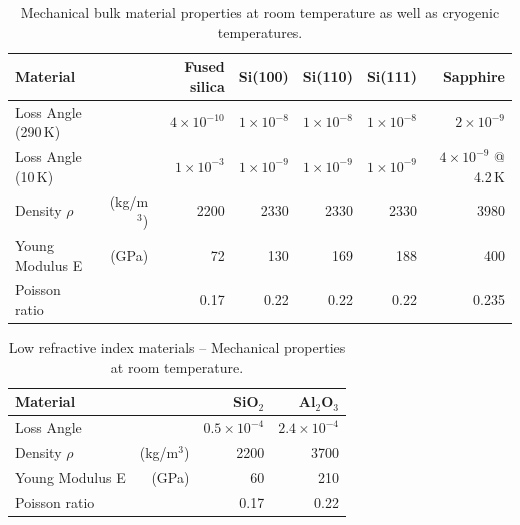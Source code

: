 \begin{table}[h!]
\begin{center}
\begin{tabular}{|l r||r|r|r|r|r|}
  \hline
    {\large\strut} Material  & & Fused silica & Si(100) & Si(110) & Si(111) & Sapphire \\
  \hline
  \hline
   {\large\strut} Loss Angle (290\,K) & & $4\times10^{-10}$ & $1\times10^{-8}$ & $1\times10^{-8}$ & $1\times10^{-8}$ & $2\times10^{-9}$ \\
   {\large\strut} Loss Angle (10\,K)  & & $1\times10^{-3} $ & $1\times10^{-9}$ & $1\times10^{-9}$ & $1\times10^{-9}$ & $4\times10^{-9}$ @ 4.2\,K \\
   {\large\strut} Density $\rho$ & (kg/m$^3$) & 2200 & 2330 & 2330 & 2330 & 3980\\
   {\large\strut} Young Modulus E & (GPa) &  72 & 130 & 169 & 188 & 400\\
   {\large\strut} Poisson ratio & & 0.17 & 0.22 & 0.22 & 0.22 & 0.235\\
  \hline
\end{tabular}
\caption{Mechanical bulk material properties at room temperature as well as cryogenic temperatures.}
\end{center}
\label{tab:Mech_Bulk_Param}
\end{table}


\begin{table}[h!]
\begin{center}
\begin{tabular}{|l r||r|r|}
  \hline
    {\large\strut} Material  & & SiO$_2$ & Al$_2$O$_3$ \\
  \hline
  \hline
   {\large\strut} Loss Angle & & $0.5\times 10^{-4}$ & $2.4\times 10^{-4}$  \\
   {\large\strut} Density $\rho$ & (kg/m$^3$) & 2200 & 3700 \\
   {\large\strut} Young Modulus E & (GPa) &  60 & 210\\
   {\large\strut} Poisson ratio & & 0.17 & 0.22 \\
  \hline
\end{tabular}
\caption{Low refractive index materials -- Mechanical properties at room temperature.}
\end{center}
\label{tab:Mech_CoatLowRef_Param}
\end{table}

